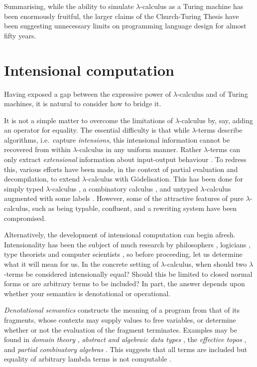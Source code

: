 \documentclass[a4paper]{article}
\begin{document}
Summarising, while the ability to simulate $\lambda$-calculus as a Turing
machine has been enormously fruitful, the larger claims of the
Church-Turing Thesis have been suggesting unnecessary limits on
programming language design for almost fifty years.

\section{Intensional computation} 
\label{sec:intensional}

Having exposed a gap between the expressive power of $\lambda$-calculus and
of Turing machines, it is natural to consider how to bridge it. 

It is not a simple matter to overcome the limitations of $\lambda$-calculus
by, say, adding an operator for equality.  The essential difficulty is
that while $\lambda$-terms describe algorithms, i.e.\ capture {\em
  intensions}, this intensional information cannot be recovered from
within $\lambda$-calculus in any uniform manner.  Rather $\lambda$-terms can
only extract {\em extensional} information about input-output
behaviour \cite[page 2]{Church41}.  To redress this, various efforts
have been made, in the context of partial evaluation and
decompilation, to extend $\lambda$-calculus with G\"odelisation.  This has
been done for simply typed $\lambda$-calculus
\cite{Berger-Schwichtenberg91}, a combinatory calculus
\cite{goldberg2000godelization}, and untyped $\lambda$-calculus augmented
with some labels \cite{goedelization:mogensen:PEPM99}.  However, some
of the attractive features of pure $\lambda$-calculus, such as being
typable, confluent, and a rewriting system have been compromised.

Alternatively, the development of intensional computation can begin
afresh.  Intensionality has been the subject of much research by
philosophers \cite{Montague60,feferman60,cellucci81,katz01}, logicians
\cite{frege1892,tichy69,Brouwer81}, type theorists \cite{lof,muskens2007,bove2009brief} and computer scientists
\cite{hobbs78,ArtemovB07,carette12}, so before proceeding, let us
determine what it will mean for us. In the concrete setting of
$\lambda$-calculus, when should two $\lambda$-terms be considered intensionally
equal? Should this be limited to closed normal forms or are arbitrary
terms to be included? In part, the answer depends upon whether your
semantics is denotational or operational.

{\em Denotational semantics} constructs the meaning of a program from that
of its fragments, whose contexts may supply values to free variables,
or determine whether or not the evaluation of the fragment terminates.
Examples may be found in {\em domain theory} \cite{Kreisel69,
  Scott76}, {\em abstract and algebraic data types} \cite{ADJ77,
  Mitchell88}, the {\em effective topos} \cite{Hyland82}, and {\em
  partial combinatory algebras} \cite{pca, CockettH08,Longley14}.
This suggests that all terms are included but equality of arbitrary
lambda terms is not computable \cite[page 519]{Bare84a}.
\end{document}
